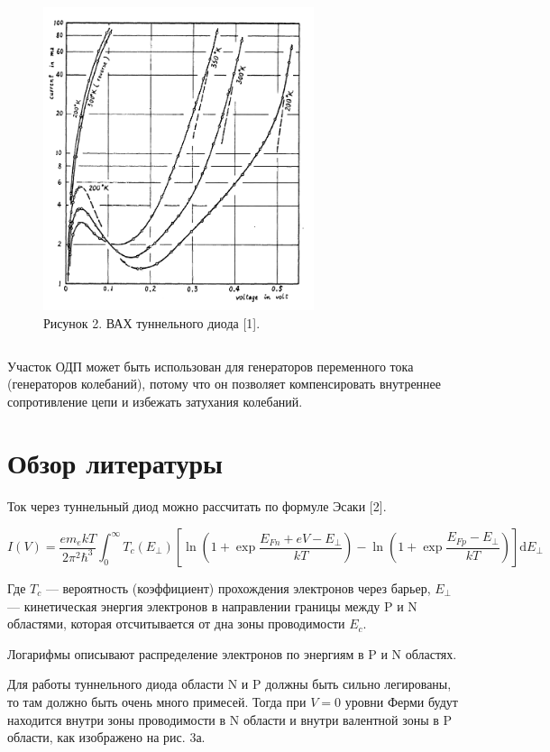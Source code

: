 \documentclass[
]{article}
\begin{document}
\begin{figure}
\centering
\includegraphics[width=3.125in,height=\textheight]{images/iv-curve.png}
\caption{Рисунок 2. ВАХ туннельного диода {[}1{]}.}
\end{figure}

\[ \]

Участок ОДП может быть использован для генераторов переменного тока
(генераторов колебаний), потому что он позволяет компенсировать
внутреннее сопротивление цепи и избежать затухания колебаний.

\section{Обзор
литературы}\label{ux43eux431ux437ux43eux440-ux43bux438ux442ux435ux440ux430ux442ux443ux440ux44b}

Ток через туннельный диод можно рассчитать по формуле Эсаки {[}2{]}.

\[I(V)=\frac{em_{e}kT}{2\pi^{2}\hbar^{3}}\int_{0}^{\infty}T_{c}\left(E_{\perp}\right)\left[\ln\left(1+\exp\frac{E_{Fn}+eV-E_{\perp}}{kT}\right)-\ln\left(1+\exp\frac{E_{Fp}-E_{\perp}}{kT}\right)\right]\mathrm{d}E_{\perp} \tag{1}\]

Где \(T_c\) --- вероятность (коэффициент) прохождения электронов через
барьер, \(E_{\perp}\) --- кинетическая энергия электронов в направлении
границы между P и N областями, которая отсчитывается от дна зоны
проводимости \(E_c\).

Логарифмы описывают распределение электронов по энергиям в P и N
областях.

Для работы туннельного диода области N и P должны быть сильно
легированы, то там должно быть очень много примесей. Тогда при \(V=0\)
уровни Ферми будут находится внутри зоны проводимости в N области и
внутри валентной зоны в P области, как изображено на рис. 3а.
\end{document}

